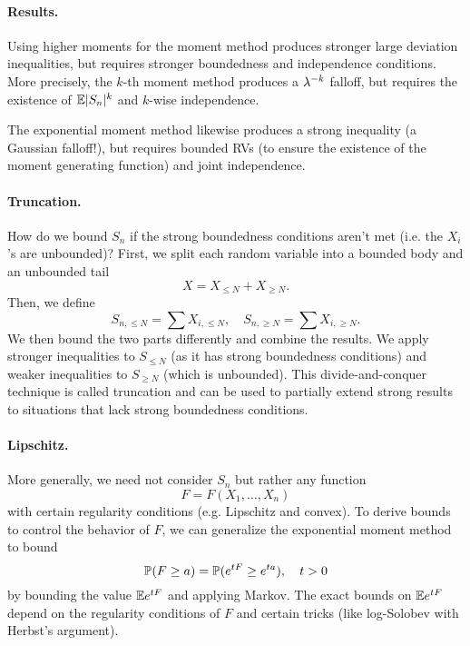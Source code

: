 \paragraph{Results.} Using higher moments for the moment method produces stronger large deviation inequalities, but requires stronger boundedness and independence conditions. More precisely, the $k$-th moment method produces a $\lambda^{-k}$ falloff, but requires the existence of ${\mathbb E} |S_n|^k$ and $k$-wise independence.

The exponential moment method likewise produces a strong inequality (a Gaussian falloff!), but requires bounded RVs (to ensure the existence of the moment generating function) and joint independence.

\paragraph{Truncation.} How do we bound $S_n$ if the strong boundedness conditions aren't met (i.e. the $X_i$'s are unbounded)? First, we split each random variable into a bounded body and an unbounded tail
\[
    X = X_{\leq N} + X_{\geq N}.
\]
Then, we define
\[
    S_{n, \leq N} = \sum X_{i, \leq N}, \quad S_{n, \geq N} = \sum X_{i, \geq N}.
\]
We then bound the two parts differently and combine the results. We apply stronger inequalities to $S_{\leq N}$ (as it has strong boundedness conditions) and weaker inequalities to $S_{\geq N}$ (which is unbounded). This divide-and-conquer technique is called truncation and can be used to partially extend strong results to situations that lack strong boundedness conditions.

\paragraph{Lipschitz.} More generally, we need not consider $S_n$ but rather any function
\[
    F = F(X_1, \dots, X_n)
\]
with certain regularity conditions (e.g. Lipschitz and convex). To derive bounds to control the behavior of $F$, we can generalize the exponential moment method to bound
\[
    {\mathbb P}(F \geq a) = {\mathbb P}(e^{tF} \geq e^{ta}), \quad t > 0
\]
by bounding the value ${\mathbb E} e^{tF}$ and applying Markov. The exact bounds on ${\mathbb E} e^{tF}$ depend on the regularity conditions of $F$ and certain tricks (like log-Solobev with Herbst's argument).


